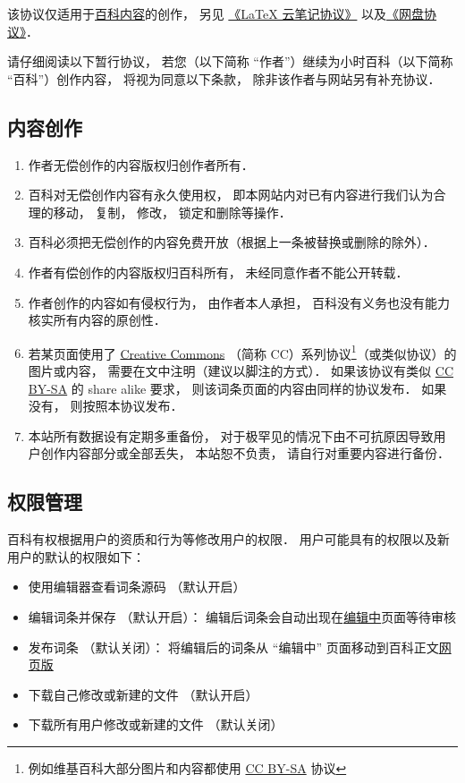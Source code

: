 
该协议仅适用于\href{http://wuli.wiki/online/}{百科内容}的创作， 另见 \href{http://wuli.wiki/online/NtLcns.html}{《LaTeX 云笔记协议》} 以及\href{http://www.example.com}{《网盘协议》}．

请仔细阅读以下暂行协议， 若您（以下简称 “作者”）继续为小时百科（以下简称 “百科”）创作内容， 将视为同意以下条款， 除非该作者与网站另有补充协议．

\subsection{内容创作}
\begin{enumerate}
\item 作者无偿创作的内容版权归创作者所有．
\item 百科对无偿创作内容有永久使用权， 即本网站内对已有内容进行我们认为合理的移动， 复制， 修改， 锁定和删除等操作．
\item 百科必须把无偿创作的内容免费开放（根据上一条被替换或删除的除外）．
\item 作者有偿创作的内容版权归百科所有， 未经同意作者不能公开转载．
\item 作者创作的内容如有侵权行为， 由作者本人承担， 百科没有义务也没有能力核实所有内容的原创性．
\item 若某页面使用了 \href{https://creativecommons.org/licenses/}{Creative Commons} （简称 CC）系列协议\footnote{例如维基百科大部分图片和内容都使用 \href{https://creativecommons.org/licenses/by-sa/3.0/}{CC BY-SA} 协议}（或类似协议）的图片或内容， 需要在文中注明（建议以脚注的方式）． 如果该协议有类似 \href{https://creativecommons.org/licenses/by-sa/3.0/}{CC BY-SA} 的 share alike 要求， 则该词条页面的内容由同样的协议发布． 如果没有， 则按照本协议发布．
\item 本站所有数据设有定期多重备份， 对于极罕见的情况下由不可抗原因导致用户创作内容部分或全部丢失， 本站恕不负责， 请自行对重要内容进行备份．
\end{enumerate}

\subsection{权限管理}
百科有权根据用户的资质和行为等修改用户的权限． 用户可能具有的权限以及新用户的默认的权限如下：
\begin{itemize}
\item 使用编辑器查看词条源码 （默认开启）
\item 编辑词条并保存 （默认开启）： 编辑后词条会自动出现在\href{http://wuli.wiki/changed}{编辑中}页面等待审核
\item 发布词条 （默认关闭）： 将编辑后的词条从 “编辑中” 页面移动到百科正文\href{http://wuli.wiki/online}{网页版}
\item 下载自己修改或新建的文件 （默认开启）
\item 下载所有用户修改或新建的文件 （默认关闭）
\end{itemize}
